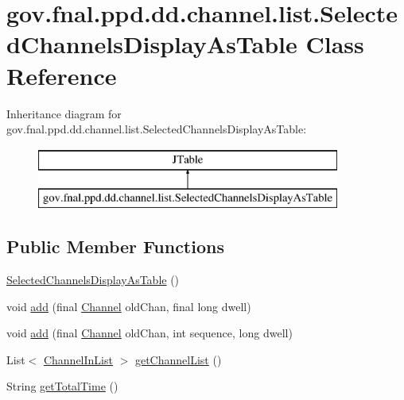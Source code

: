 \hypertarget{classgov_1_1fnal_1_1ppd_1_1dd_1_1channel_1_1list_1_1SelectedChannelsDisplayAsTable}{\section{gov.\-fnal.\-ppd.\-dd.\-channel.\-list.\-Selected\-Channels\-Display\-As\-Table Class Reference}
\label{classgov_1_1fnal_1_1ppd_1_1dd_1_1channel_1_1list_1_1SelectedChannelsDisplayAsTable}
}
Inheritance diagram for gov.\-fnal.\-ppd.\-dd.\-channel.\-list.\-Selected\-Channels\-Display\-As\-Table\-:\begin{figure}[H]
\begin{center}
\leavevmode
\includegraphics[height=2.000000cm]{classgov_1_1fnal_1_1ppd_1_1dd_1_1channel_1_1list_1_1SelectedChannelsDisplayAsTable}
\end{center}
\end{figure}
\subsection*{Public Member Functions}
\begin{DoxyCompactItemize}
\item 
\hyperlink{classgov_1_1fnal_1_1ppd_1_1dd_1_1channel_1_1list_1_1SelectedChannelsDisplayAsTable_a74c25a602d252653e9dd70ac0cef057e}{Selected\-Channels\-Display\-As\-Table} ()
\item 
void \hyperlink{classgov_1_1fnal_1_1ppd_1_1dd_1_1channel_1_1list_1_1SelectedChannelsDisplayAsTable_ab0ffb7d55ba467934f72598f02c87301}{add} (final \hyperlink{interfacegov_1_1fnal_1_1ppd_1_1dd_1_1signage_1_1Channel}{Channel} old\-Chan, final long dwell)
\item 
void \hyperlink{classgov_1_1fnal_1_1ppd_1_1dd_1_1channel_1_1list_1_1SelectedChannelsDisplayAsTable_a26e022a0c56496d6b4a99f51a4cc9526}{add} (final \hyperlink{interfacegov_1_1fnal_1_1ppd_1_1dd_1_1signage_1_1Channel}{Channel} old\-Chan, int sequence, long dwell)
\item 
List$<$ \hyperlink{classgov_1_1fnal_1_1ppd_1_1dd_1_1channel_1_1ChannelInList}{Channel\-In\-List} $>$ \hyperlink{classgov_1_1fnal_1_1ppd_1_1dd_1_1channel_1_1list_1_1SelectedChannelsDisplayAsTable_a711f34ff09b13ade321d6cd4e03569bf}{get\-Channel\-List} ()
\item 
String \hyperlink{classgov_1_1fnal_1_1ppd_1_1dd_1_1channel_1_1list_1_1SelectedChannelsDisplayAsTable_ac1880f75ac14d29c4d005aad5212acb3}{get\-Total\-Time} ()
\end{DoxyCompactItemize}


